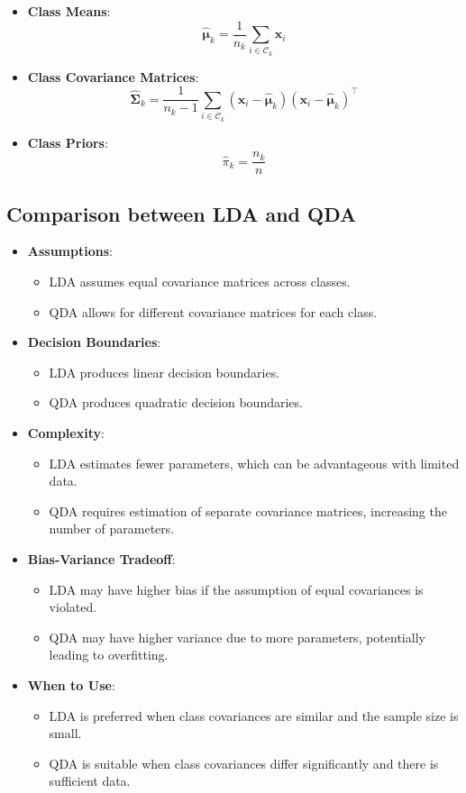 \documentclass{article}
\begin{document}
\begin{itemize}
  \item \textbf{Class Means}:
  \[
  \hat{\boldsymbol{\mu}}_k = \frac{1}{n_k} \sum_{i \in \mathcal{C}_k} \mathbf{x}_i
  \]
  \item \textbf{Class Covariance Matrices}:
  \[
  \hat{\boldsymbol{\Sigma}}_k = \frac{1}{n_k - 1} \sum_{i \in \mathcal{C}_k} (\mathbf{x}_i - \hat{\boldsymbol{\mu}}_k)(\mathbf{x}_i - \hat{\boldsymbol{\mu}}_k)^\top
  \]
  \item \textbf{Class Priors}:
  \[
  \hat{\pi}_k = \frac{n_k}{n}
  \]
\end{itemize}

\subsection{Comparison between LDA and QDA}

\begin{itemize}
  \item \textbf{Assumptions}:
  \begin{itemize}
    \item LDA assumes equal covariance matrices across classes.
    \item QDA allows for different covariance matrices for each class.
  \end{itemize}
  \item \textbf{Decision Boundaries}:
  \begin{itemize}
    \item LDA produces linear decision boundaries.
    \item QDA produces quadratic decision boundaries.
  \end{itemize}
  \item \textbf{Complexity}:
  \begin{itemize}
    \item LDA estimates fewer parameters, which can be advantageous with limited data.
    \item QDA requires estimation of separate covariance matrices, increasing the number of parameters.
  \end{itemize}
  \item \textbf{Bias-Variance Tradeoff}:
  \begin{itemize}
    \item LDA may have higher bias if the assumption of equal covariances is violated.
    \item QDA may have higher variance due to more parameters, potentially leading to overfitting.
  \end{itemize}
  \item \textbf{When to Use}:
  \begin{itemize}
    \item LDA is preferred when class covariances are similar and the sample size is small.
    \item QDA is suitable when class covariances differ significantly and there is sufficient data.
  \end{itemize}
\end{itemize}
\end{document}
